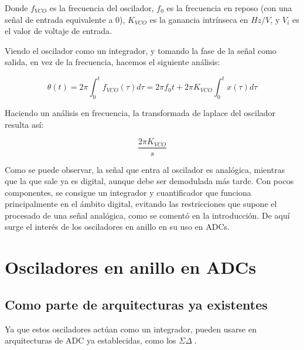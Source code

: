 \documentclass[12pt]{report} %
\newcommand{\sigmadelta}{$\Sigma\Delta\; $}
\begin{document}
	Donde $f_{VCO}$ es la frecuencia del oscilador, $f_{0}$ es la frecuencia en reposo (con una señal de entrada equivalente a 0), $K_{VCO}$ es la ganancia intrínseca en $Hz/V$, y $V_{i}$ es el valor de voltaje de entrada.
	
	Viendo el oscilador como un integrador, y tomando la fase de la señal como salida, en vez de la frecuencia, hacemos el siguiente análisis:
	
	\begin{figure}[H]
		\begin{equation}
			\label{vco-phase}
			\theta(t) = 2\pi\int_{0}^{t}f_{VCO}(\tau)d\tau = 2\pi f_{0}t + 2\pi K_{VCO}\int_{0}^{t}x(\tau)d\tau
		\end{equation}
		\footnotemark
	\end{figure}
	
	Haciendo un análisis en frecuencia, la transformada de laplace del oscilador resulta así:
	
	\begin{figure}[H]
		\begin{equation}
			\label{vco-laplace}
			\frac{2 \pi K_{VCO}}{s}
		\end{equation}
		\footnotemark
	\end{figure}
	
	
	Como se puede observar, la señal que entra al oscilador es analógica, mientras que la que sale ya es digital, aunque debe ser demodulada más tarde. Con pocos componentes, se consigue un integrador y cuantificador que funciona principalmente en el ámbito digital, evitando las restricciones que supone el procesado de una señal analógica, como se comentó en la introducción. De aquí surge el interés de los osciladores en anillo en su uso en ADCs.
	
	\section{Osciladores en anillo en ADCs}
	
	\subsection{Como parte de arquitecturas ya existentes}
	Ya que estos osciladores actúan como un integrador, pueden usarse en arquitecturas de ADC ya establecidas, como los \sigmadelta.
	
\end{document}
